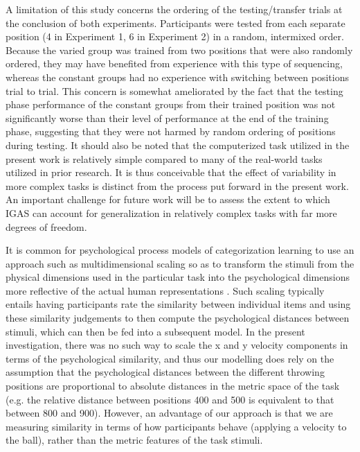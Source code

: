 \documentclass[
  12pt,
  letterpaper,
]{article}
\begin{document}
A limitation of this study concerns the ordering of the testing/transfer
trials at the conclusion of both experiments. Participants were tested
from each separate position (4 in Experiment 1, 6 in Experiment 2) in a
random, intermixed order. Because the varied group was trained from two
positions that were also randomly ordered, they may have benefited from
experience with this type of sequencing, whereas the constant groups had
no experience with switching between positions trial to trial. This
concern is somewhat ameliorated by the fact that the testing phase
performance of the constant groups from their trained position was not
significantly worse than their level of performance at the end of the
training phase, suggesting that they were not harmed by random ordering
of positions during testing. It should also be noted that the
computerized task utilized in the present work is relatively simple
compared to many of the real-world tasks utilized in prior research. It
is thus conceivable that the effect of variability in more complex tasks
is distinct from the process put forward in the present work. An
important challenge for future work will be to assess the extent to
which IGAS can account for generalization in relatively complex tasks
with far more degrees of freedom.

It is common for psychological process models of categorization learning
to use an approach such as multidimensional scaling so as to transform
the stimuli from the physical dimensions used in the particular task
into the psychological dimensions more reflective of the actual human
representations
\autocite{nosofskySimilarityScalingCognitive1992,shepardUniversalLawGeneralization1987}.
Such scaling typically entails having participants rate the similarity
between individual items and using these similarity judgements to then
compute the psychological distances between stimuli, which can then be
fed into a subsequent model. In the present investigation, there was no
such way to scale the x and y velocity components in terms of the
psychological similarity, and thus our modelling does rely on the
assumption that the psychological distances between the different
throwing positions are proportional to absolute distances in the metric
space of the task (e.g. the relative distance between positions 400 and
500 is equivalent to that between 800 and 900). However, an advantage of
our approach is that we are measuring similarity in terms of how
participants behave (applying a velocity to the ball), rather than the
metric features of the task stimuli.
\end{document}
